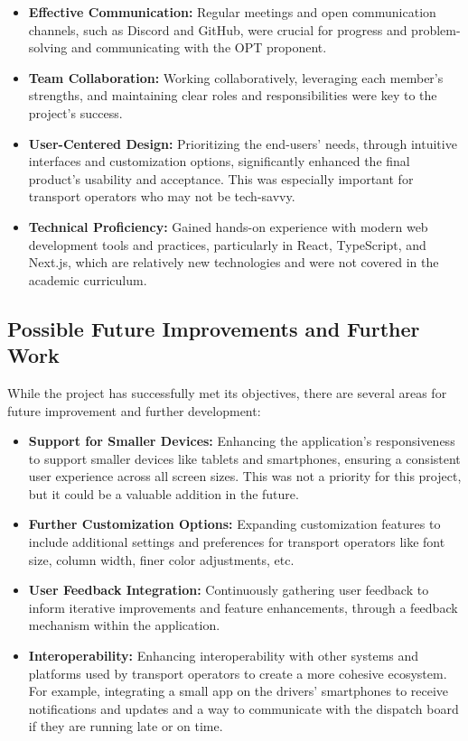 \documentclass[10pt]{article}
\begin{document}
         \begin{itemize}
             \item \textbf{Effective Communication:} Regular meetings and open communication channels, such as Discord and GitHub, were crucial for progress and problem-solving and communicating with the OPT proponent.
             \item \textbf{Team Collaboration:} Working collaboratively, leveraging each member's strengths, and maintaining clear roles and responsibilities were key to the project's success.
             \item \textbf{User-Centered Design:} Prioritizing the end-users' needs, through intuitive interfaces and customization options, significantly enhanced the final product's usability and acceptance. This was especially important for transport operators who may not be tech-savvy.
             \item \textbf{Technical Proficiency:} Gained hands-on experience with modern web development tools and practices, particularly in React, TypeScript, and Next.js, which are relatively new technologies and were not covered in the academic curriculum.
         \end{itemize}


         \subsection{Possible Future Improvements and Further Work}

         While the project has successfully met its objectives, there are several areas for future improvement and further development:

         \begin{itemize}
             \item \textbf{Support for Smaller Devices:} Enhancing the application's responsiveness to support smaller devices like tablets and smartphones, ensuring a consistent user experience across all screen sizes. This was not a priority for this project, but it could be a valuable addition in the future.
             \item \textbf{Further Customization Options:} Expanding customization features to include additional settings and preferences for transport operators like font size, column width, finer color adjustments, etc.
             \item \textbf{User Feedback Integration:} Continuously gathering user feedback to inform iterative improvements and feature enhancements, through a feedback mechanism within the application.
             \item \textbf{Interoperability:} Enhancing interoperability with other systems and platforms used by transport operators to create a more cohesive ecosystem. For example, integrating a small app on the drivers' smartphones to receive notifications and updates and a way to communicate with the dispatch board if they are running late or on time.
         \end{itemize}
\end{document}
